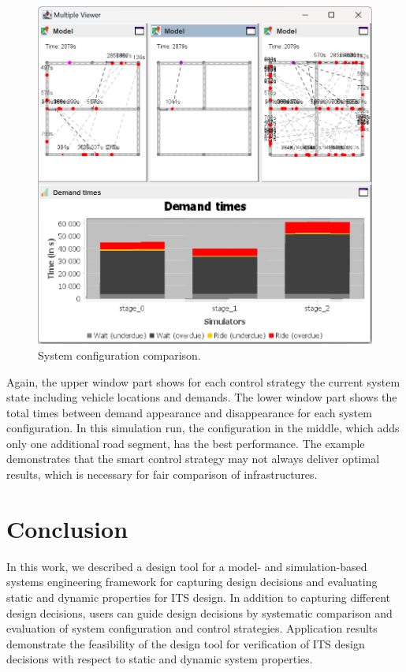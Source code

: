 \documentclass[a4paper,twoside]{article}
\begin{document}
	\begin{figure}[!ht]
		\centering
		\includegraphics[width=0.85\columnwidth]{./graphics/screenshots/infrastructure_comparison.png}
		\caption{System configuration comparison.}
		\label{fig:infratructure-comparison}
	\end{figure}
	
	Again, the upper window part shows for each control strategy the current system state including vehicle locations and demands.
	The lower window part shows the total times between demand appearance and disappearance for each system configuration.
	In this simulation run, the configuration in the middle, which adds only one additional road segment, has the best performance.
	The example demonstrates that the smart control strategy may not always deliver optimal results, which is necessary for fair comparison of infrastructures.
	
	\section{Conclusion}
	\label{sec:conclusion}
	
	In this work, we described a design tool for a model- and simulation-based systems engineering framework for capturing design decisions and evaluating static and dynamic properties for ITS design.
	In addition to capturing different design decisions, users can guide design decisions by systematic comparison and evaluation of system configuration and control strategies.
	Application results demonstrate the feasibility of the design tool for verification of ITS design decisions with respect to static and dynamic system properties.
	
	
	{\small }
	
\end{document}
